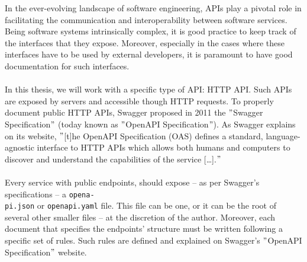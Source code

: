 In the ever-evolving landscape of software engineering, APIs play a pivotal role in facilitating the communication and interoperability between software services.
Being software systems intrinsically complex, it is good practice to keep track of the interfaces that they expose.
Moreover, especially in the cases where these interfaces have to be used by external developers, it is paramount to have good documentation for such interfaces. \\ \\
In this thesis, we will work with a specific type of API: HTTP API\@.
Such APIs are exposed by servers and accessible though HTTP requests.
To properly document public HTTP APIs, Swagger proposed in 2011 the \("\)Swagger Specification\("\) (today known as \("\)OpenAPI Specification\("\)).
As Swagger explains on its website, \("\)[t]he OpenAPI Specification (OAS) defines a standard, language-agnostic interface to HTTP APIs which allows both humans and computers to discover and understand the capabilities of the service [\dots].\("\)~\cite{swagger} \\ \\
Every service with public endpoints, should expose -- as per Swagger's specifications -- a \verb|opena-| \\ \verb|pi.json| or \verb|openapi.yaml| file.
This file can be one, or it can be the root of several other smaller files -- at the discretion of the author.
Moreover, each document that specifies the endpoints' structure must be written following a specific set of rules.
Such rules are defined and explained on Swagger's \("\)OpenAPI Specification\("\) website.
